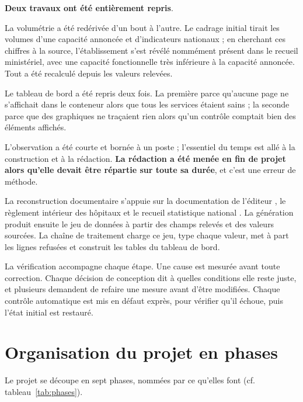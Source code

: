 \textbf{Deux travaux ont été entièrement repris}.

La volumétrie a été redérivée d'un bout à l'autre. Le cadrage initial tirait les volumes d'une
capacité annoncée et d'indicateurs nationaux ; en cherchant ces chiffres à la source,
l'établissement s'est révélé nommément présent dans le recueil ministériel, avec une capacité
fonctionnelle très inférieure à la capacité annoncée. Tout a été recalculé depuis les valeurs
relevées.

Le tableau de bord a été repris deux fois. La première parce qu'aucune page ne s'affichait dans le
conteneur alors que tous les services étaient sains ; la seconde parce que des graphiques ne
traçaient rien alors qu'un contrôle comptait bien des éléments affichés.

L'observation a été courte et bornée à un poste ; l'essentiel du temps est allé à la construction
et à la rédaction. \textbf{La rédaction a été menée en fin de projet alors qu'elle devait être
répartie sur toute sa durée}, et c'est une erreur de méthode.

La reconstruction documentaire s'appuie sur la documentation de l'éditeur \cite{s06}, le règlement
intérieur des hôpitaux \cite{s27} et le recueil statistique national \cite{s30}. La
génération produit ensuite le jeu de données à partir des champs relevés et des valeurs sourcées. La
chaîne de traitement charge ce jeu, type chaque valeur, met à part les lignes refusées et construit
les tables du tableau de bord.

La vérification accompagne chaque étape. Une cause est mesurée avant toute correction. Chaque
décision de conception dit à quelles conditions elle reste juste, et plusieurs demandent de refaire
une mesure avant d'être modifiées. Chaque contrôle automatique est mis en défaut exprès, pour
vérifier qu'il échoue, puis l'état initial est restauré.

\section{Organisation du projet en phases}

Le projet se découpe en sept phases, nommées par ce qu'elles font
(cf. tableau~\ref{tab:phases}).

